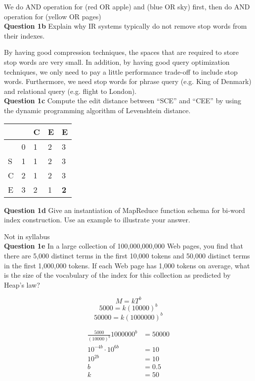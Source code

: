 \documentclass[11pt,a4paper]{report}
\begin{document}
\begin{multicols*}{2}
\noindent We do AND operation for (red OR apple) and (blue OR sky) first, then do AND operation for (yellow OR pages)\\

\noindent \textbf{Question 1b} Explain why IR systems typically do not remove stop words from their indexes. 

\noindent By having good compression techniques, the spaces that are required to store stop words are very small. In addition, by having good query optimization techniques, we only need to pay a little performance trade-off to include stop words. Furthermore, we need stop words for phrase query (e.g. King of Denmark) and relational query (e.g. flight to London). \\

\noindent \textbf{Question 1c} Compute the edit distance between ``SCE'' and ``CEE'' by using the dynamic programming algorithm of Levenshtein distance. 

\begin{center}
\begin{tabular}{ | l | l  l  l  l  |} 
    \hline
      &   & C & E & E \\
    \hline
      & 0 & 1 & 2 & 3 \\
    S & 1 & 1 & 2 & 3 \\
    C & 2 & 1 & 2 & 3 \\
    E & 3 & 2 & 1 & \textbf{2} \\
    \hline
\end{tabular}
\end{center}

\noindent \textbf{Question 1d} Give an instantiation of MapReduce function schema for bi-word index construction. Use an example to illustrate your answer.

\noindent Not in syllabus\\

\noindent \textbf{Question 1e} In a large collection of 100,000,000,000 Web pages, you find that there are 5,000 distinct terms in the first 10,000 tokens and 50,000 distinct terms in the first 1,000,000 tokens. If each Web page has 1,000 tokens on average, what is the size of the vocabulary of the index for this collection as predicted by Heap's law?

$$M=kT^b$$
$$5000=k(10000)^b$$
$$50000=k(1000000)^b$$

\begin{equation*}
\begin{split}
    \frac{5000}{(10000)^b}1000000^b &= 50000 \\
    10^{-4b}\cdot 10^{6b} &= 10 \\
    10^{2b} &= 10\\
    b &= 0.5\\
    k &= 50
\end{split}
\end{equation*}


\end{multicols*}
\end{document}
